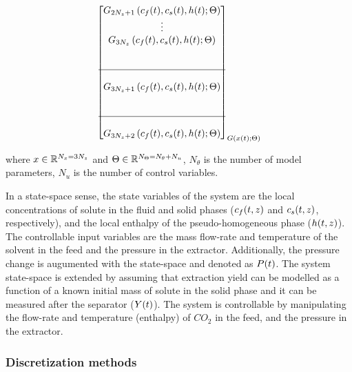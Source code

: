 \documentclass[../Article_Model_Parameters.tex]{subfiles}
\begin{document}
{\begin{align*}
{\begin{bmatrix}
							{\color{black}G_{2N_z+1}} \left( {\color{black}c_f}(t),{\color{black}c_s}(t),{\color{black}h}(t); {\color{black}\Theta} \right) \\
							\vdots\\
							{\color{black}G_{3N_z}} \left( {\color{black}c_f}(t),{\color{black}c_s}(t),{\color{black}h}(t); {\color{black}\Theta} \right) \\ 
							\\ \\ \hline \\
							{\color{black}G_{3N_z+1}} \left( {\color{black}c_f}(t),{\color{black}c_s}(t),{\color{black}h}(t); {\color{black}\Theta} \right) \\
							\\ \\ \hline \\
							{\color{black}G_{3N_z+2}} \left( {\color{black}c_f}(t),{\color{black}c_s}(t),{\color{black}h}(t); {\color{black}\Theta} \right) 
					\end{bmatrix}}_{{\color{black}G} \left( {\color{black}x}(t); {\color{black}\Theta} \right)} 
			\end{align*} }
			
			where ${\color{black}x} \in \mathbb{R}^{N_x = 3N_z} $ and ${\color{black}\Theta} \in \mathbb{R}^{N_\Theta =  N_{\theta} + N_u } $, $N_{\theta}$ is the number of model parameters, $N_{u}$ is the number of control variables.
			
			In a state-space sense, the state variables of the system are the local concentrations of solute in the fluid and solid phases (${\color{black}c_f}(t,z)$ and ${\color{black}c_s}(t,z)$, respectively), and the local enthalpy of the pseudo-homogeneous phase (${\color{black}h}(t,z)$). The controllable input variables are the mass flow-rate and temperature of the solvent in the feed and the pressure in the extractor. Additionally, the pressure change is augumented with the state-space and denoted as ${\color{black}P}(t)$.
			The system state-space is extended by assuming that extraction yield can be modelled as a function of a known initial mass of solute in the solid phase and it can be measured after the separator (${\color{black}Y}(t)$). The system is controllable by manipulating the flow-rate and temperature (enthalpy) of $CO_2$ in the feed, and the pressure in the extractor.
			
			\subsubsection{Discretization methods}
			
\end{document}
